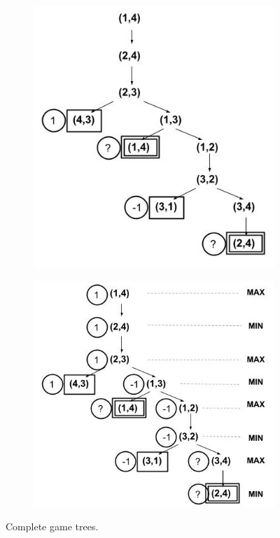 \documentclass[12pt]{article}
\begin{document}
\begin{enumerate}[label=(\alph*)]
    \begin{figure}
        \begin{subfigure}{0.5\textwidth}
            \centering
            \includegraphics[scale=0.7]{homework1/images/drawndiagrams/prob2a.jpg}
            \caption{}
            \label{fig:prob2a}
        \end{subfigure}
        \begin{subfigure}{0.5\textwidth}
            \centering
            \includegraphics[width=\textwidth]{homework1/images/drawndiagrams/prob2b.jpg}
            \caption{}
            \label{fig:prob2b}
        \end{subfigure}
        \caption{Complete game trees.}
    \end{figure}


\end{enumerate}
\end{document}
